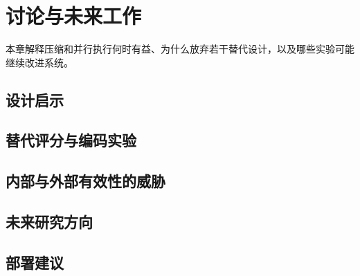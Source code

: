 \chapter{讨论与未来工作}
\label{ch:discussion}

本章解释压缩和并行执行何时有益、为什么放弃若干替代设计，以及哪些实验可能继续改进系统。

\section{设计启示}
\label{sec:8-1}


\section{替代评分与编码实验}
\label{sec:8-2}


\section{内部与外部有效性的威胁}
\label{sec:8-3}


\section{未来研究方向}
\label{sec:8-4}


\section{部署建议}
\label{sec:8-5}

